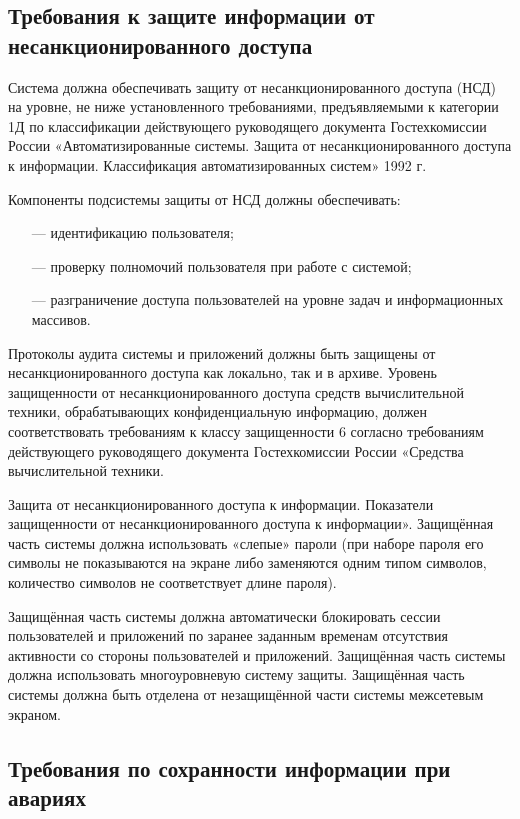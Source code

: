 \subsection{Требования к защите информации от несанкционированного доступа}

Система должна обеспечивать защиту от несанкционированного доступа (НСД) на уровне, не ниже установленного требованиями, предъявляемыми к категории 1Д по классификации действующего руководящего документа Гостехкомиссии России «Автоматизированные системы. Защита от несанкционированного доступа к информации. Классификация автоматизированных систем» 1992 г. 

Компоненты подсистемы защиты от НСД должны обеспечивать:

\begin{itemize}
\item[---]идентификацию пользователя;
\item[---]проверку полномочий пользователя при работе с системой;
\item[---]разграничение доступа пользователей на уровне задач и информационных массивов.
\end{itemize}

Протоколы аудита системы и приложений должны быть защищены от несанкционированного доступа как локально, так и в архиве. Уровень защищенности от несанкционированного доступа средств вычислительной техники, обрабатывающих конфиденциальную информацию, должен соответствовать требованиям к классу защищенности 6 согласно требованиям действующего руководящего документа Гостехкомиссии России «Средства вычислительной техники.

Защита от несанкционированного доступа к информации. Показатели защищенности от несанкционированного доступа к информации». Защищённая часть системы должна использовать «слепые» пароли (при наборе пароля его символы не показываются на экране либо заменяются одним типом символов, количество символов не соответствует длине пароля).

Защищённая часть системы должна автоматически блокировать сессии пользователей и приложений по заранее заданным временам отсутствия активности со стороны пользователей и приложений. Защищённая часть системы должна использовать многоуровневую систему защиты. Защищённая часть системы должна быть отделена от незащищённой части системы межсетевым экраном.

\subsection{Требования по сохранности информации при авариях}

